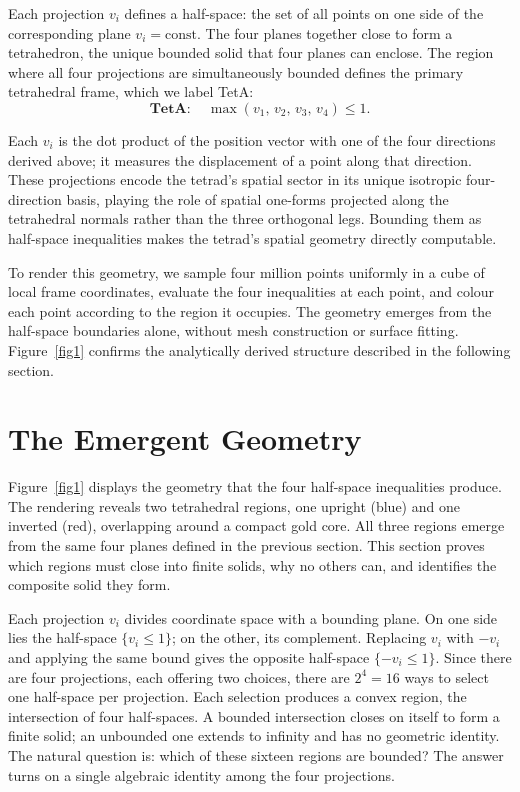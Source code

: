 \documentclass[twocolumn]{iopjournal}
\begin{document}
Each projection $v_i$ defines a half-space: the set of all points on one side of the corresponding plane $v_i = \mathrm{const}$. The four planes together close to form a tetrahedron, the unique bounded solid that four planes can enclose. The region where all four projections are simultaneously bounded defines the primary tetrahedral frame, which we label TetA:
\begin{equation}
\textbf{TetA}: \quad \max(v_1,\, v_2,\, v_3,\, v_4) \leq 1.
\end{equation}

Each $v_i$ is the dot product of the position vector with one of the four directions derived above; it measures the displacement of a point along that direction. These projections encode the tetrad's spatial sector in its unique isotropic four-direction basis, playing the role of spatial one-forms projected along the tetrahedral normals rather than the three orthogonal legs. Bounding them as half-space inequalities makes the tetrad's spatial geometry directly computable.

To render this geometry, we sample four million points uniformly in a cube of local frame coordinates, evaluate the four inequalities at each point, and colour each point according to the region it occupies. The geometry emerges from the half-space boundaries alone, without mesh construction or surface fitting. Figure~\ref{fig1} confirms the analytically derived structure described in the following section.

\section*{The Emergent Geometry}

Figure~\ref{fig1} displays the geometry that the four half-space
inequalities produce. The rendering reveals two tetrahedral regions, one
upright (blue) and one inverted (red), overlapping around a compact gold
core. All three regions emerge from the same four planes defined in the
previous section. This section proves which regions must close into finite
solids, why no others can, and identifies the composite solid they form.

Each projection $v_i$ divides coordinate space with a bounding plane. On
one side lies the half-space $\{v_i \leq 1\}$; on the other, its
complement. Replacing $v_i$ with $-v_i$ and applying the same bound gives
the opposite half-space $\{-v_i \leq 1\}$. Since there are four
projections, each offering two choices, there are $2^4 = 16$ ways to
select one half-space per projection. Each selection produces a convex
region, the intersection of four half-spaces. A bounded intersection
closes on itself to form a finite solid; an unbounded one extends to
infinity and has no geometric identity. The natural question is: which of
these sixteen regions are bounded? The answer turns on a single algebraic
identity among the four projections.
\end{document}
